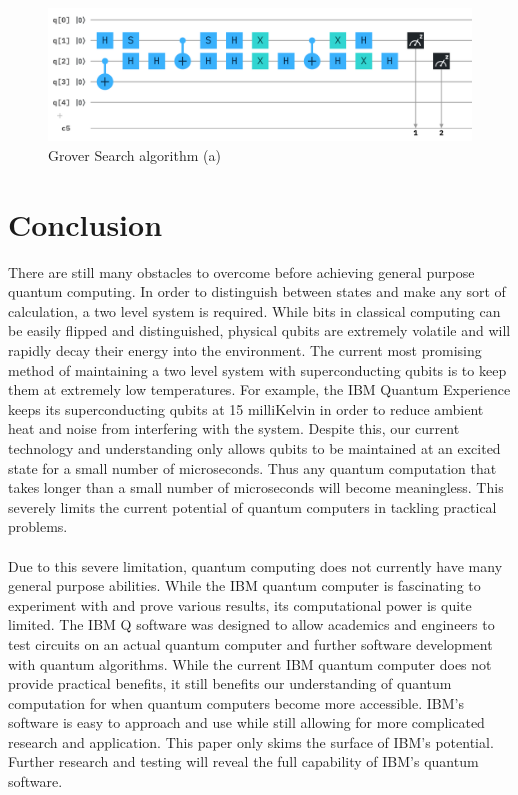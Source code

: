 \documentclass[12pt]{article}
\begin{document}
\begin{figure}[h!t]
\begin{minipage}{0.35\linewidth}
            \end{minipage}%
            \begin{minipage}{0.65\linewidth}
                \includegraphics[width=\linewidth]{Circuits/grover.png}
            \end{minipage}
            \caption{Grover Search algorithm (a)}
        \end{figure}
        \newpage
    
\section{Conclusion}
    There are still many obstacles to overcome before achieving general purpose quantum computing. In order to distinguish between states and make any sort of calculation, a two level system is required. While bits in classical computing can be easily flipped and distinguished, physical qubits are extremely volatile and will rapidly decay their energy into the environment. The current most promising method of maintaining a two level system with superconducting qubits is to keep them at extremely low temperatures. For example, the IBM Quantum Experience keeps its superconducting qubits at 15 milliKelvin in order to reduce ambient heat and noise from interfering with the system. Despite this, our current technology and understanding only allows qubits to be maintained at an excited state for a small number of microseconds. Thus any quantum computation that takes longer than a small number of microseconds will become meaningless. This severely limits the current potential of quantum computers in tackling practical problems.
    \\
    \smallskip
    \\
    Due to this severe limitation, quantum computing does not currently have many general purpose abilities. While the IBM quantum computer is fascinating to experiment with and prove various results, its computational power is quite limited. The IBM Q software was designed to allow academics and engineers to test circuits on an actual quantum computer and further software development with quantum algorithms. While the current IBM quantum computer does not provide practical benefits, it still benefits our understanding of quantum computation for when quantum computers become more accessible. IBM's software is easy to approach and use while still allowing for more complicated research and application. This paper only skims the surface of IBM's potential. Further research and testing will reveal the full capability of IBM's quantum software.
    
\end{document}
